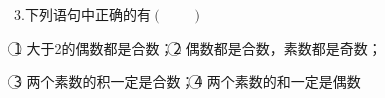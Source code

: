 \question 3.下列语句中正确的有\hfill$\left(\qquad\right)$

\textcircled{1} 大于2的偶数都是合数；\textcircled{2} 偶数都是合数，素数都是奇数；

\textcircled{3} 两个素数的积一定是合数；\textcircled{4} 两个素数的和一定是偶数

